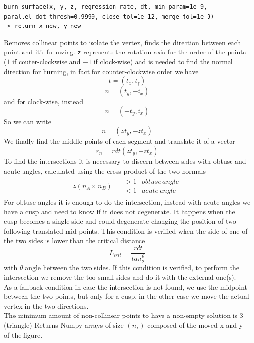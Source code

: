 \begin{verbatim}
burn_surface(x, y, z, regression_rate, dt, min_param=1e-9, 
parallel_dot_thresh=0.9999, close_tol=1e-12, merge_tol=1e-9)
-> return x_new, y_new
\end{verbatim}
\hspace*{2em} Removes collinear points to isolate the vertex, finds the direction between each point and it's following. \verb|z| represents the rotation axis for the order of the points ($1$ if couter-clockwise and $-1$ if clock-wise) and is needed to find the normal direction for burning, in fact for counter-clockwise order we have
\begin{equation}
    t=(t_x,t_y)
\end{equation}
\begin{equation}
    n=(t_y,-t_x)
\end{equation}
and for clock-wise, instead
\begin{equation}
    n=(-t_y,t_x)
\end{equation}
So we can write
\begin{equation}
    n=(zt_y,-zt_x)
\end{equation}
We finally find the middle points of each segment and translate it of a vector
\begin{equation}
    r_n=rdt(zt_y,-zt_x)
\end{equation}
To find the intersections it is necessary to discern between sides with obtuse and acute angles, calculated using the cross product of the two normals
\begin{gather}
    z(n_A \times n_B)= \begin{matrix} >1 & obtuse\ angle\\ <1& acute\ angle\end{matrix}
\end{gather}
For obtuse angles it is enough to do the intersection, instead with acute angles we have a cusp and need to know if it does not degenerate. It happens when the cusp becomes a single side and could degenerate changing the position of two following translated mid-points. This condition is verified when the side of one of the two sides is lower than the critical distance
\begin{equation}
    L_{crit}=\frac{rdt}{tan{\frac{\theta}{2}}}
\end{equation}
with $\theta$ angle between the two sides.
If this condition is verified, to perform the intersection we remove the too small sides and do it with the external one(s).\\ 
As a fallback condition in case the intersection is not found, we use the midpoint between the two points, but only for a cusp, in the other case we move the actual vertex in the two directions.\\
The minimum amount of non-collinear points to have a non-empty solution is $3$ (triangle)
Returns Numpy arrays of size $(n,)$ composed of the moved x and y of the figure.


